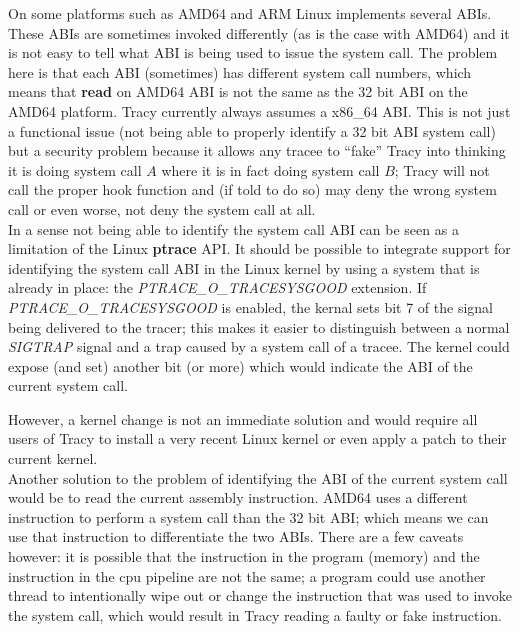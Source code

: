 \documentclass[a4paper, 10pt]{report}
\begin{document}
On some platforms such as AMD64 and ARM Linux implements several ABIs.
These ABIs are sometimes invoked differently (as is the case with AMD64)
and it is not easy to tell what ABI is being used to issue the system call.
The problem here is that each ABI (sometimes) has different system call
numbers, which means that \textbf{read} on AMD64 ABI is not the same
as the 32 bit ABI on the AMD64 platform. Tracy currently always assumes
a x86\_64 ABI. This is not just a functional issue (not being able to
properly identify a 32 bit ABI system call) but a security problem because it
allows any tracee to ``fake'' Tracy into thinking it is doing system call $A$
where it is in fact doing system call $B$; Tracy will not call the proper hook
function and (if told to do so) may deny the wrong system call or even worse,
not deny the system call at all. \\

In a sense not being able to identify the system call ABI can be seen as a
limitation of the Linux \textbf{ptrace} API. It should be possible to
integrate support for identifying the system call ABI in the Linux kernel
by using a system that is already in place: the \textit{PTRACE\_O\_TRACESYSGOOD}
extension. If \textit{PTRACE\_O\_TRACESYSGOOD} is enabled, the kernal sets bit 7
of the signal being delivered to the tracer; this makes it easier to distinguish
between a normal \textit{SIGTRAP} signal and a trap caused by a system call of
a tracee. The kernel could expose (and set) another bit (or more) which would
indicate the ABI of the current system call.

However, a kernel change is not an immediate solution and would require all
users of Tracy to install a very recent Linux kernel or even apply a patch
to their current kernel. \\

Another solution to the problem of identifying the ABI of the current
system call would be to read the current assembly instruction. AMD64 uses a
different instruction to perform a system call than the 32 bit ABI; which
means we can use that instruction to differentiate the two ABIs. There are a
few caveats however: it is possible that the instruction in the program (memory)
and the instruction in the cpu pipeline are not the same; a program could use
another thread to intentionally wipe out or change the instruction that was
used to invoke the system call, which would result in Tracy reading a faulty
or fake instruction. \\
\end{document}
